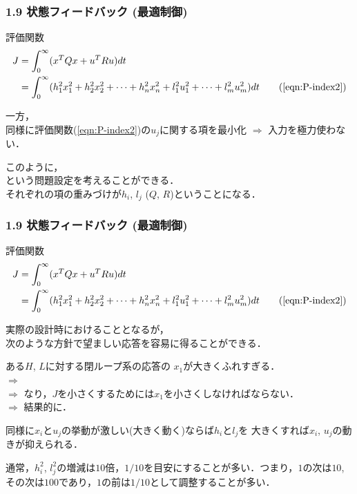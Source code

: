 \begin{frame}[t]
\frametitle{1.9 状態フィードバック (最適制御)}
評価関数
\begin{align}
 J
 &= \int_{0}^{\infty} (x^T Q x + u^T R u) dt \nonumber \\
 &= \int_0^{\infty} (h_1^2 x_1^2 + h_2^2 x_2^2 + \cdots +
     h_n^2 x_n^2 + l_1^2 u_1^2 + \cdots + l_m^2 u_m^2)dt
\tag{\ref{eqn:P-index2}}
\end{align}

一方，\\
同様に評価関数(\ref{eqn:P-index2})の$u_j$に関する項を最小化
$\Longrightarrow$ 入力を極力使わない．

\vspace{5mm}

このように，\\
という問題設定を考えることができる．\\
それぞれの項の重みづけが$h_i$, $l_j$ ($Q$, $R$)ということになる．
\end{frame}


\begin{frame}[t]
\frametitle{1.9 状態フィードバック (最適制御)}
評価関数
\begin{align}
 J
 &= \int_{0}^{\infty} (x^T Q x + u^T R u) dt \nonumber \\
 &= \int_0^{\infty} (h_1^2 x_1^2 + h_2^2 x_2^2 + \cdots +
     h_n^2 x_n^2 + l_1^2 u_1^2 + \cdots + l_m^2 u_m^2)dt
\tag{\ref{eqn:P-index2}}
\end{align}

実際の設計時におけることとなるが，\\
次のような方針で望ましい応答を容易に得ることができる．

\vspace{5mm}

ある$H$, $L$に対する閉ループ系の応答の
$x_1$が大きくふれすぎる．\\
$\Longrightarrow$ \\
$\Longrightarrow$ なり，$J$を小さくするためには$x_1$を小さくしなければならない．\\
$\Longrightarrow$ 結果的に．\\

\vspace{3mm}

同様に$x_i$と$u_j$の挙動が激しい(大きく動く)ならば$h_i$と$l_j$を
大きくすれば$x_i$, $u_j$の動きが抑えられる．

通常，$h_i^2$, $l_j^2$の増減は$10$倍，$1/10$を目安にすることが多い．つまり，$1$の次は$10$, その次は$100$であり，$1$の前は$1/10$として調整することが多い．

\end{frame}

